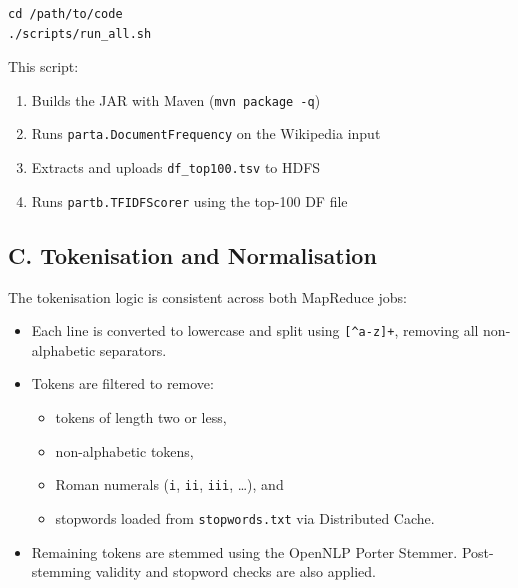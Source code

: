 \documentclass[12pt,a4paper]{article}
\begin{document}
\begin{lstlisting}[style=shellstyle]
cd /path/to/code
./scripts/run_all.sh
\end{lstlisting}

This script:
\begin{enumerate}
    \item Builds the JAR with Maven (\texttt{mvn package -q})
    \item Runs \texttt{parta.DocumentFrequency} on the Wikipedia input
    \item Extracts and uploads \texttt{df\_top100.tsv} to HDFS
    \item Runs \texttt{partb.TFIDFScorer} using the top-100 DF file
\end{enumerate}

\subsection*{C. Tokenisation and Normalisation}

The tokenisation logic is consistent across both MapReduce jobs:

\begin{itemize}
    \item Each line is converted to lowercase and split using
    \texttt{[{\textasciicircum}a-z]+}, removing all non-alphabetic separators.
    \item Tokens are filtered to remove:
    \begin{itemize}
        \item tokens of length two or less,
        \item non-alphabetic tokens,
        \item Roman numerals (\texttt{i}, \texttt{ii}, \texttt{iii}, \ldots), and
        \item stopwords loaded from \texttt{stopwords.txt} via Distributed Cache.
    \end{itemize}
    \item Remaining tokens are stemmed using the OpenNLP Porter Stemmer.
    Post-stemming validity and stopword checks are also applied.
\end{itemize}
\end{document}
